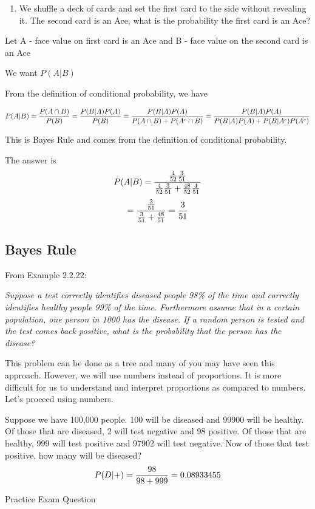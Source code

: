 \documentclass[]{book}
\providecommand{\tightlist}{%
  \setlength{\itemsep}{0pt}\setlength{\parskip}{0pt}}
\theoremstyle{definition}
\theoremstyle{definition}
\theoremstyle{definition}
\theoremstyle{remark}
\begin{document}
\begin{enumerate}
\def\labelenumi{\arabic{enumi}.}
\setcounter{enumi}{3}
\tightlist
\item
  We shuffle a deck of cards and set the first card to the side without
  revealing it. The second card is an Ace, what is the probability the
  first card is an Ace?
\end{enumerate}

Let A - face value on first card is an Ace and B - face value on the
second card is an Ace

We want \(P(A|B)\)

From the definition of conditional probability, we have

\[P(A|B)={P(A \cap B) \over P(B)}={P(B|A)P(A) \over P(B)}={P(B|A)P(A) \over P(A \cap B)+P(A^c \cap B)}={P(B|A)P(A) \over P(B|A)P(A)+P(B|A^c)P(A^c)}\]

This is Bayes Rule and comes from the definition of conditional
probability.

The answer is
\[P(A|B)={{4 \over 52}{3 \over 51} \over {4 \over 52}{3 \over 51}+ {48 \over 52}{4 \over 51}}\]
\[={{3 \over 51} \over {3 \over 51}+ {48 \over 51}}={3 \over 51}\]

\subsection{Bayes Rule}\label{bayes-rule}

From Example 2.2.22:

\emph{Suppose a test correctly identifies diseased people 98\% of the
time and correctly identifies healthy people 99\% of the time.
Furthermore assume that in a certain population, one person in 1000 has
the disease. If a random person is tested and the test comes back
positive, what is the probability that the person has the disease?}

This problem can be done as a tree and many of you may have seen this
approach. However, we will use numbers instead of proportions. It is
more difficult for us to understand and interpret proportions as
compared to numbers. Let's proceed using numbers.

Suppose we have 100,000 people. 100 will be diseased and 99900 will be
healthy. Of those that are diseased, 2 will test negative and 98
positive. Of those that are healthy, 999 will test positive and 97902
will test negative. Now of those that test positive, how many will be
diseased? \[P(D|+)={98 \over 98+999}=0.08933455\]

Practice Exam Question
\end{document}
